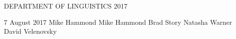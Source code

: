 \documentclass[dissertation,copyright]{uathesis}\usepackage[]{graphicx}\usepackage[]{color}
\begin{document}
\maketitlepage
{DEPARTMENT OF LINGUISTICS}	%
{2017}							

\approval
{7 August 2017}		%
{Mike Hammond}	%
{Mike Hammond}	%
{Brad Story}		%
{Natasha Warner}		%
{David Velenovsky}		%
{}		%

\statementbyauthor



\tableofcontents

\listoffigures

\listoftables
















%

\renewcommand{\baselinestretch}{1}		%
\small\normalsize						%





\end{document}
